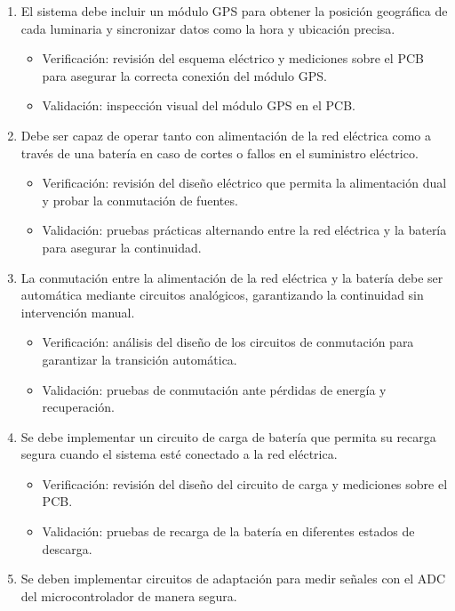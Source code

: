 \documentclass[
11pt, %
]{charter}
\begin{document}
\begin{enumerate}
\begin{enumerate}
			\item El sistema debe incluir un módulo GPS para obtener la posición geográfica de cada luminaria y sincronizar datos como la hora y ubicación precisa.
				\begin{itemize}
				\item Verificación: revisión del esquema eléctrico y mediciones sobre el PCB para asegurar la correcta conexión del módulo GPS. 
				\item Validación: inspección visual del módulo GPS en el PCB.
				\end{itemize}
			\item Debe ser capaz de operar tanto con alimentación de la red eléctrica como a través de una batería en caso de cortes o fallos en el suministro eléctrico. 
				\begin{itemize}
				\item Verificación: revisión del diseño eléctrico que permita la alimentación dual y probar la conmutación de fuentes.
				\item Validación: pruebas prácticas alternando entre la red eléctrica y la batería para asegurar la continuidad.
				\end{itemize}
\pagebreak
			\item La conmutación entre la alimentación de la red eléctrica y la batería debe ser automática mediante circuitos analógicos, garantizando la continuidad sin intervención manual.
				\begin{itemize}
				\item Verificación: análisis del diseño de los circuitos de conmutación para garantizar la transición automática.
				\item Validación: pruebas de conmutación ante pérdidas de energía y recuperación.
				\end{itemize}
			\item Se debe implementar un circuito de carga de batería que permita su recarga segura cuando el sistema esté conectado a la red eléctrica.
				\begin{itemize}
				\item Verificación: revisión del diseño del circuito de carga y mediciones sobre el PCB.
				\item Validación: pruebas de recarga de la batería en diferentes estados de descarga.
				\end{itemize}
			\item Se deben implementar circuitos de adaptación para medir señales con el ADC del microcontrolador de manera segura.
				\begin{itemize}

\end{itemize}
\end{enumerate}
\end{enumerate}
\end{document}

